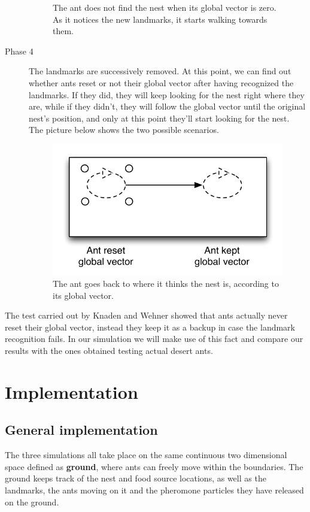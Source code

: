 \documentclass[11pt]{article}
\begin{document}
\begin{description}
\begin{figure}[h!]
     \caption{The ant does not find the nest when its global vector is zero. As it notices the new landmarks, it starts walking towards them.}
\end{figure}
\item[Phase 4] The landmarks are successively removed. At this point, we can find out whether ants reset or not their global vector after having recognized the landmarks. If they did, they will keep looking for the nest right where they are, while if they didn't, they will follow the global vector until the original nest's position, and only at this point they'll start looking for the nest. The picture below shows the two possible scenarios.
\begin{figure}[h!]
  \centering
    \includegraphics[width=.6\textwidth]{images/phase4}
     \caption{The ant goes back to where it thinks the nest is, according to its global vector.}
\end{figure}
\end{description}

The test carried out by Knaden and Wehner showed that ants actually never reset their global vector, instead they keep it as a backup in case the landmark recognition fails. In our simulation we will make use of this fact and compare our results with the ones obtained testing actual desert ants.

\section{Implementation}

\subsection{General implementation}
The three simulations all take place on the same continuous two dimensional space defined as \textbf{ground}, where ants can freely move within the boundaries. The ground keeps track of the nest and food source locations, as well as the landmarks, the ants moving on it and the pheromone particles they have released on the ground.
\end{document}
